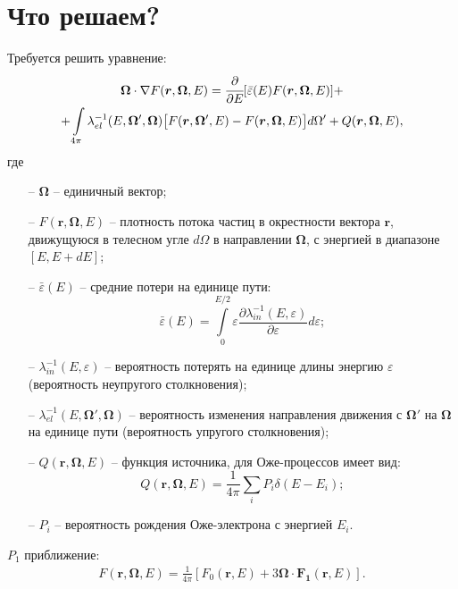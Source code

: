 \documentclass[a4paper,12pt]{article} %
\newcommand{\df}[1]{\cfrac{\partial}{\partial #1}}
\newcommand{\dff}[2]{\frac{\partial #1}{\partial #2}}
\renewcommand{\vec}[1]{\bm{#1}}
\newcommand{\eps}{\varepsilon}
\begin{document}
\section{Что решаем?}

Требуется решить уравнение:
\begin{equation}\label{eq: main}
\begin{gathered}
    \vec{\Omega}\cdot\nabla F(\vec{r}, \vec{\Omega}, E) =
    \df{E}[\bar{\eps}(E)F(\vec{r}, \vec{\Omega}, E)] + \\ +
    \int\limits_{4\pi} \lambda^{-1}_{el}(E, \vec{\Omega}', \vec{\Omega}) \big[ F(\vec{r}, \vec{\Omega}', E) - F(\vec{r}, \vec{\Omega}, E) \big] d\Omega' +
    Q(\vec{r}, \vec{\Omega}, E),
\end{gathered}
\end{equation}
где
\begin{itemize}
    \item[--] $\vec{\Omega}$ -- единичный вектор;
    \item[--] $F(\vec{r}, \vec{\Omega}, E)$ --  плотность потока частиц в
        окрестности вектора $\vec{r}$, движущуюся в телесном угле $d\Omega$ в
        направлении $\vec{\Omega}$, с энергией в диапазоне $[E, E+dE]$;
    \item[--] $\bar{\eps}(E)$ -- средние потери на единице пути:
    \begin{equation}\label{eq: sharp}
        \bar{\eps}(E) = \int\limits_{0}^{E/2} \eps \dff{\lambda_{in}^{-1}(E,
        \eps)}{\eps} d\eps;
    \end{equation}
    \item[--] $\lambda_{in}^{-1}(E, \eps)$ -- вероятность потерять на единице длины энергию $\eps$ (вероятность неупругого столкновения);
    \item[--] $\lambda^{-1}_{el}(E, \vec{\Omega}', \vec{\Omega})$ -- вероятность изменения направления движения с $\vec{\Omega}'$ на $\vec{\Omega}$ на единице пути (вероятность упругого столкновения);
    \item[--] $Q(\vec{r}, \vec{\Omega}, E)$ -- функция источника, для Оже-процессов имеет вид:
    \begin{equation}
        Q(\vec{r}, \vec{\Omega}, E) = \frac{1}{4\pi} \sum_{i} P_i\delta(E - E_i);
    \end{equation}
    \item[--] $P_i$ -- вероятность рождения Оже-электрона с энергией $E_i$.
\end{itemize}

$P_1$ приближение:
\begin{gather}\label{eq: P1}
    F(\vec{r}, \vec{\Omega}, E) = \frac{1}{4\pi} [ F_0(\vec{r}, E) + 3 \vec{\Omega}\cdot\vec{F_1}(\vec{r}, E) ].
\end{gather}
\end{document}
